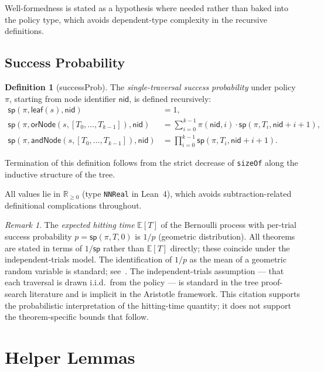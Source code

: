 \documentclass[reqno,11pt]{amsart}
\newcommand{\EE}{\mathbb{E}}
\newcommand{\Rnn}{\mathbb{R}_{\ge 0}}
\newcommand{\sP}{\mathsf{sp}}
\newcommand{\leafN}{\mathsf{leaf}}
\newcommand{\orN}{\mathsf{orNode}}
\newcommand{\andN}{\mathsf{andNode}}
\newcommand{\nid}{\mathsf{nid}}
\theoremstyle{plain}
\theoremstyle{definition}
\newtheorem{definition}[theorem]{Definition}
\theoremstyle{remark}
\newtheorem{remark}[theorem]{Remark}
\begin{document}
Well-formedness is stated as a hypothesis where needed rather than baked into the policy type, which avoids dependent-type complexity in the recursive definitions.

\subsection{Success Probability}

\begin{definition}[successProb]
The \emph{single-traversal success probability} under policy $\pi$, starting from node identifier $\nid$, is defined recursively:
\begin{align*}
\sP(\pi, \leafN(s), \nid) &= 1,\\
\sP(\pi, \orN(s, [T_0,\ldots,T_{k-1}]), \nid)
  &= \sum_{i=0}^{k-1} \pi(\nid, i)\cdot \sP(\pi, T_i, \nid+i+1),\\
\sP(\pi, \andN(s, [T_0,\ldots,T_{k-1}]), \nid)
  &= \prod_{i=0}^{k-1} \sP(\pi, T_i, \nid+i+1).
\end{align*}
\end{definition}

Termination of this definition follows from the strict decrease of \texttt{sizeOf} along the inductive structure of the tree.

All values lie in $\Rnn$ (type \texttt{NNReal} in Lean~4), which avoids subtraction-related definitional complications throughout.

\begin{remark}
The \emph{expected hitting time} $\EE[T]$ of the Bernoulli process with per-trial success probability $p = \sP(\pi, T, 0)$ is $1/p$ (geometric distribution). All theorems are stated in terms of $1/\sP$ rather than $\EE[T]$ directly; these coincide under the independent-trials model. The identification of $1/p$ as the mean of a geometric random variable is standard; see~\citet[Chapter~I]{Feller1968}. The independent-trials assumption --- that each traversal is drawn i.i.d.\ from the policy --- is standard in the tree proof-search literature and is implicit in the Aristotle framework. This citation supports the probabilistic interpretation of the hitting-time quantity; it does not support the theorem-specific bounds that follow.
\end{remark}

\section{Helper Lemmas}
\end{document}
